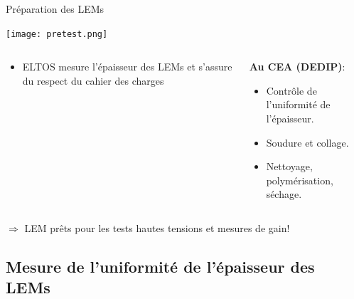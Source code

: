     \begin{frame}{Préparation des LEMs}
    	\begin{scriptsize}
    		\begin{center}
		    	\texttt{[image: pretest.png]}
	    	\end{center}
	    	\begin{columns}
	    		\begin{column}{0.5\textwidth}
	    			\begin{itemize}
	    				\item ELTOS mesure l'épaisseur des LEMs et s'assure du respect du cahier des charges
	    			\end{itemize}
	    		\end{column}\hfill
	    		\begin{column}{0.5\textwidth}
	    			\textbf{\hspace{0.3cm}Au CEA (DEDIP)}:
	    			\begin{itemize}
	    				\item Contrôle de l'uniformité de l'épaisseur.
	    				\item Soudure et collage.
	    				\item Nettoyage, polymérisation, séchage.
	    			\end{itemize}
	    		\end{column}
	    	\end{columns}
	    \end{scriptsize}
	    \vspace{0.5cm}
        $\Rightarrow$ LEM prêts pour les tests hautes tensions et mesures de gain!
    \end{frame}

    \subsection[Épaisseur]{Mesure de l'uniformité de l'épaisseur des LEMs}


